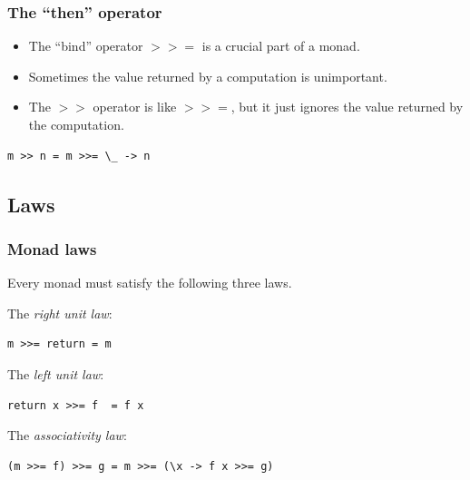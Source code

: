 \documentclass{beamer}
\begin{document}
\begin{frame}[fragile]
\frametitle{The ``then'' operator}

\begin{itemize}
\item The ``bind'' operator $>>=$ is a crucial part of a monad.
\item Sometimes the value returned by a computation is unimportant.
\item The $>>$ operator is like $>>=$, but it just ignores the
  value returned by the computation.
\end{itemize}

\begin{verbatim}
m >> n = m >>= \_ -> n
\end{verbatim}

\end{frame}

\subsection{Laws}
\begin{frame}[fragile]
\frametitle{Monad laws}

Every monad must satisfy the following three laws.

\vspace{1em}

The \emph{right unit law}:

\begin{verbatim}
m >>= return = m
\end{verbatim}

The \emph{left unit law}:

\begin{verbatim}
return x >>= f  = f x
\end{verbatim}

The \emph{associativity law}:

\begin{verbatim}
(m >>= f) >>= g = m >>= (\x -> f x >>= g)
\end{verbatim}

\end{frame}

\end{document}
